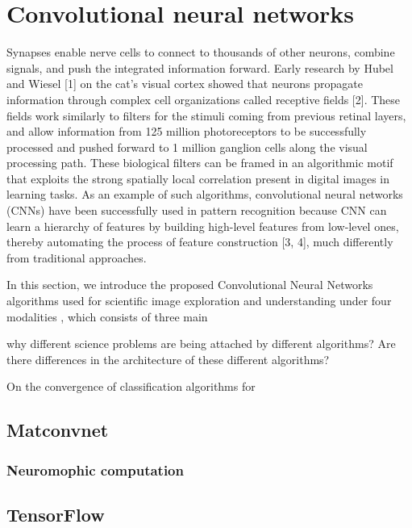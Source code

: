 \section{Convolutional neural networks}
Synapses enable nerve cells to connect to thousands of other neurons, combine signals, and push the integrated information forward. Early research by Hubel and Wiesel [1] on the cat’s visual cortex showed that neurons propagate information through complex cell organizations called receptive fields [2]. These fields work similarly to filters for the stimuli coming from previous retinal layers, and allow information from 125 million photoreceptors to be successfully processed and pushed forward to 1 million ganglion cells along the visual processing path. These biological filters can be framed in an algorithmic motif that exploits the strong spatially local correlation present in digital images in learning tasks. As an example of such algorithms, convolutional neural networks (CNNs) have been successfully used in pattern recognition because CNN can learn a hierarchy of features by building high-level features from low-level ones, thereby automating the process of feature construction [3, 4], much differently from traditional approaches.

In this section, we introduce the proposed Convolutional Neural Networks algorithms used for scientific image exploration and understanding under four modalities
, which consists of three main

why different science problems are being attached by different algorithms? Are there differences in the architecture of these different algorithms?

On the convergence of classification algorithms for

\subsection{Matconvnet}

\subsubsection{Neuromophic computation}


\subsection{TensorFlow}

